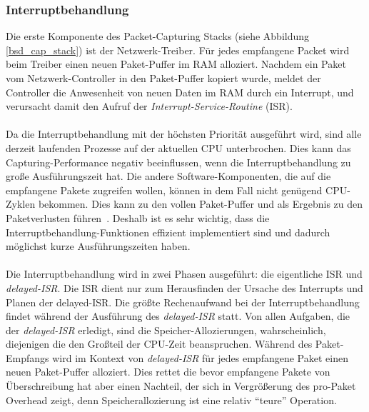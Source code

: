 \subsubsection{Interruptbehandlung}\label{sec:intr_behandlung}
Die erste Komponente des Packet-Capturing Stacks (siehe Abbildung
\ref{bsd_cap_stack}) ist der Netzwerk-Treiber. Für jedes empfangene Packet wird
beim Treiber einen neuen Paket-Puffer im RAM alloziert. Nachdem ein Paket vom
Netzwerk-Controller in den Paket-Puffer kopiert wurde, meldet der Controller
die Anwesenheit von neuen Daten im RAM durch ein Interrupt, und verursacht damit den
Aufruf der \emph{Interrupt-Service-Routine} (ISR).\\\\ 
%
Da die Interruptbehandlung mit der höchsten Priorität ausgeführt wird, sind
alle derzeit laufenden Prozesse auf der aktuellen CPU unterbrochen. Dies kann
das Capturing-Performance negativ beeinflussen, wenn die Interruptbehandlung zu
große  Ausführungszeit hat. Die andere Software-Komponenten, die auf die
empfangene Pakete zugreifen wollen, können in dem Fall nicht genügend
CPU-Zyklen bekommen.  Dies kann zu den vollen Paket-Puffer und als Ergebnis zu
den Paketverlusten führen~\cite{elim_recv_lock}. Deshalb ist es sehr wichtig,
dass die Interruptbehandlung-Funktionen effizient implementiert sind und
dadurch möglichst kurze Ausführungszeiten haben.\\\\
%
Die Interruptbehandlung wird in zwei Phasen ausgeführt: die eigentliche ISR und
\emph{delayed-ISR}. Die ISR dient nur zum Herausfinden der Ursache des
Interrupts und Planen der delayed-ISR. Die größte Rechenaufwand bei der
Interruptbehandlung findet während der Ausführung des \emph{delayed-ISR}
statt. Von allen Aufgaben, die der \emph{delayed-ISR} erledigt,
sind die Speicher-Allozierungen, wahrscheinlich, diejenigen die den Großteil
der CPU-Zeit beanspruchen. Während des Paket-Empfangs wird im Kontext von
\emph{delayed-ISR} für jedes empfangene Paket einen neuen Paket-Puffer
alloziert. Dies rettet die bevor empfangene Pakete von Überschreibung hat aber
einen Nachteil, der sich in Vergrößerung des pro-Paket Overhead zeigt,
denn Speicherallozierung ist eine relativ ``teure'' Operation.
%
